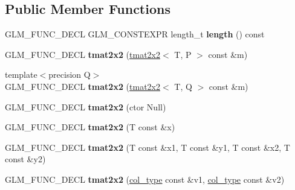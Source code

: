 \subsection*{Public Member Functions}
\begin{DoxyCompactItemize}
\item 
G\+L\+M\+\_\+\+F\+U\+N\+C\+\_\+\+D\+E\+CL G\+L\+M\+\_\+\+C\+O\+N\+S\+T\+E\+X\+PR length\+\_\+t {\bfseries length} () const \hypertarget{structglm_1_1detail_1_1tmat2x2_a4d96bf05400619458dd382d9302924a0}{}\label{structglm_1_1detail_1_1tmat2x2_a4d96bf05400619458dd382d9302924a0}

\item 
G\+L\+M\+\_\+\+F\+U\+N\+C\+\_\+\+D\+E\+CL {\bfseries tmat2x2} (\hyperlink{structglm_1_1detail_1_1tmat2x2}{tmat2x2}$<$ T, P $>$ const \&m)\hypertarget{structglm_1_1detail_1_1tmat2x2_ace6c970e91f6eace80227602531e4d8a}{}\label{structglm_1_1detail_1_1tmat2x2_ace6c970e91f6eace80227602531e4d8a}

\item 
{\footnotesize template$<$precision Q$>$ }\\G\+L\+M\+\_\+\+F\+U\+N\+C\+\_\+\+D\+E\+CL {\bfseries tmat2x2} (\hyperlink{structglm_1_1detail_1_1tmat2x2}{tmat2x2}$<$ T, Q $>$ const \&m)\hypertarget{structglm_1_1detail_1_1tmat2x2_a0273bde43902469715fd10c0fd06cac4}{}\label{structglm_1_1detail_1_1tmat2x2_a0273bde43902469715fd10c0fd06cac4}

\item 
G\+L\+M\+\_\+\+F\+U\+N\+C\+\_\+\+D\+E\+CL {\bfseries tmat2x2} (ctor Null)\hypertarget{structglm_1_1detail_1_1tmat2x2_a6b5779f97416696975e15936e8c96e0a}{}\label{structglm_1_1detail_1_1tmat2x2_a6b5779f97416696975e15936e8c96e0a}

\item 
G\+L\+M\+\_\+\+F\+U\+N\+C\+\_\+\+D\+E\+CL {\bfseries tmat2x2} (T const \&x)\hypertarget{structglm_1_1detail_1_1tmat2x2_a8fe44c67c08b09a6e1086593b600582d}{}\label{structglm_1_1detail_1_1tmat2x2_a8fe44c67c08b09a6e1086593b600582d}

\item 
G\+L\+M\+\_\+\+F\+U\+N\+C\+\_\+\+D\+E\+CL {\bfseries tmat2x2} (T const \&x1, T const \&y1, T const \&x2, T const \&y2)\hypertarget{structglm_1_1detail_1_1tmat2x2_ac66f031aca7d5f0e52e92b0c9ab664a7}{}\label{structglm_1_1detail_1_1tmat2x2_ac66f031aca7d5f0e52e92b0c9ab664a7}

\item 
G\+L\+M\+\_\+\+F\+U\+N\+C\+\_\+\+D\+E\+CL {\bfseries tmat2x2} (\hyperlink{structglm_1_1detail_1_1tvec2}{col\+\_\+type} const \&v1, \hyperlink{structglm_1_1detail_1_1tvec2}{col\+\_\+type} const \&v2)\hypertarget{structglm_1_1detail_1_1tmat2x2_a98263653fc582781e4babe149a4fdd99}{}\label{structglm_1_1detail_1_1tmat2x2_a98263653fc582781e4babe149a4fdd99}


\end{DoxyCompactItemize}
